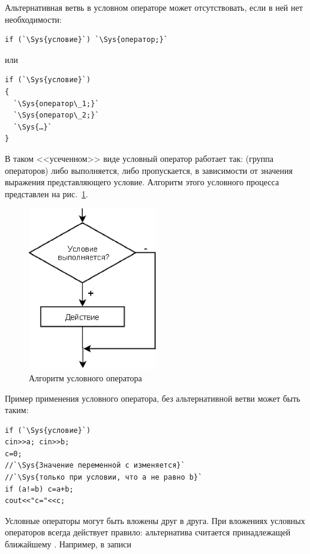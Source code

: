 Альтернативная ветвь  в условном операторе может отсутствовать, если в ней нет необходимости: 
\begin{lstlisting}
if (`\Sys{условие}`) `\Sys{оператор;}`
\end{lstlisting}
или
\begin{lstlisting}
if (`\Sys{условие}`)
{
  `\Sys{оператор\_1;}`
  `\Sys{оператор\_2;}`
  `\Sys{…}`
}
\end{lstlisting}

В таком <<усеченном>> виде условный оператор работает так:  (группа операторов) либо
выполняется, либо пропускается, в зависимости от значения выражения представляющего условие. Алгоритм этого условного
процесса представлен на рис.~\ref{ch03:refDrawing8}.

\begin{figure}[htb]
\begin{center}
\includegraphics[width=0.5\textwidth]{img/ris_3_9}
\caption{Алгоритм условного оператора }
\label{ch03:refDrawing8}
\end{center}
\end{figure}

Пример применения условного оператора, без альтернативной ветви  может быть таким:

\begin{lstlisting}
if (`\Sys{условие}`)
cin>>a; cin>>b;
c=0;
//`\Sys{Значение переменной c изменяется}`
//`\Sys{только при условии, что a не равно b}`
if (a!=b) c=a+b;
cout<<"c="<<c;
\end{lstlisting}

Условные операторы могут быть вложены друг в друга. При вложениях условных операторов всегда действует правило:
альтернатива  считается принадлежащей ближайшему . Например, в записи

